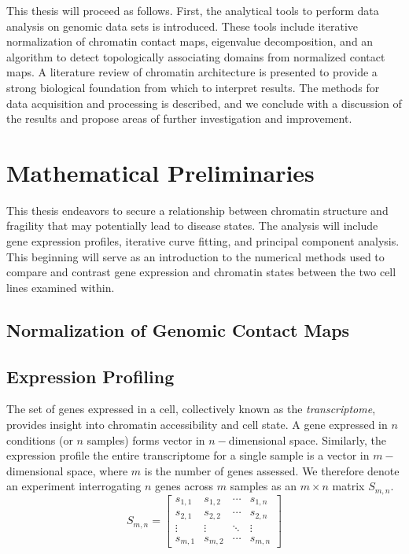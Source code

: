 \documentclass[phd,tocprelim]{cornell}
\begin{document}
This thesis will proceed as follows.  First, the analytical tools to perform data analysis on genomic
data sets is introduced.  These tools include iterative normalization of chromatin contact maps, eigenvalue
decomposition, and an algorithm to detect topologically associating domains from normalized contact maps.
A literature review of chromatin architecture is presented to provide a strong biological foundation from which
to interpret results.  The methods for data acquisition and processing is described, and we conclude with a
discussion of the results and propose areas of further investigation and improvement.


\chapter{Mathematical Preliminaries}

This thesis endeavors to secure a relationship between chromatin structure and fragility that may potentially lead to
disease states.  The analysis will include gene expression profiles, iterative curve fitting, and principal component analysis.  This
beginning will serve as an introduction to the numerical methods used to compare and contrast gene expression and chromatin states
between the two cell lines examined within.

\section{Normalization of Genomic Contact Maps}



\section{Expression Profiling}

The set of genes expressed in a cell, collectively known as the \textit{transcriptome}, provides insight into chromatin accessibility
and cell state.  A gene expressed in $n$ conditions (or $n$ samples) forms vector in $n-$dimensional space.  Similarly, the expression
profile the entire transcriptome for a single sample is a vector in $m-$dimensional space, where $m$ is the number of genes assessed.
We therefore denote an experiment interrogating $n$ genes across $m$ samples as an $m \times n$ matrix $S_{m,n}$.
\[
  S_{m,n} = \left[
    \begin{array}{ccc}
      s_{1,1} & s_{1,2} & \cdots & s_{1,n} \\
      s_{2,1} & s_{2,2} & \cdots & s_{2,n} \\
      \vdots & \vdots & \ddots  & \vdots \\
      s_{m,1} & s_{m,2} & \cdots & s_{m,n}
    \end{array}
  \right]
\]
\end{document}
